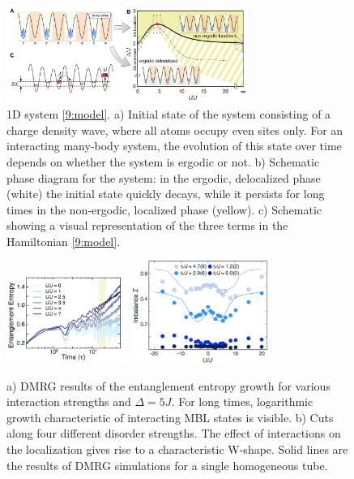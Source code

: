 








\begin{figure}[h]
    \centering
    \includegraphics[width=0.7\textwidth]{imgs/1d_phases.png}
    \caption{\cite{schreiber_observation_2015} 1D system \eqref{9:model}. a) Initial state of the system consisting of a charge density wave, where all atoms occupy even sites only. For an interacting many-body system, the evolution of this state over time depends on whether the system is ergodic or not. b) Schematic phase diagram for the system: in the ergodic, delocalized phase (white) the initial state quickly decays, while it persists for long times in the non-ergodic, localized phase (yellow). c) Schematic showing a visual representation of the three terms in the Hamiltonian \eqref{9:model}. }
    \label{fig:1Dmain}
\end{figure}






\begin{figure}[h]
    \centering
    \includegraphics[align=c, width=0.35\textwidth]{imgs/1d_add1.png}
    \hspace{10 mm} 
    \includegraphics[align=c, width=0.4\textwidth]{imgs/1d_add2.png}
    \caption{
    \cite{schreiber_observation_2015}
        a) DMRG results of the entanglement entropy growth for various interaction strengths and $\Delta = 5 J$. For long times, logarithmic growth characteristic of interacting MBL states is visible.
        b) Cuts along four different disorder strengths. The effect of interactions on the localization gives rise to a characteristic W-shape. Solid lines are the results of DMRG simulations for a single homogeneous tube. 
    }
    \label{fig:1daddb}
\end{figure}

